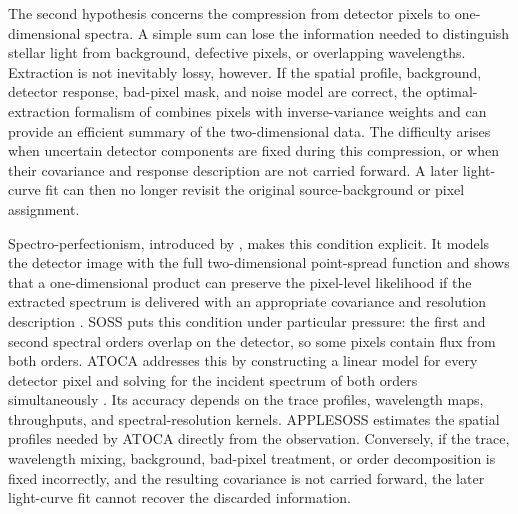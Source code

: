 The second hypothesis concerns the compression from detector pixels to
one-dimensional spectra. A simple sum can lose the information needed to
distinguish stellar light from background, defective pixels, or overlapping
wavelengths. Extraction is not inevitably lossy, however. If the spatial
profile, background, detector response, bad-pixel mask, and noise model are
correct, the optimal-extraction formalism of \citet{Horne1986} combines pixels
with inverse-variance weights and can provide an efficient summary of the
two-dimensional data. The difficulty arises when uncertain detector components
are fixed during this compression, or when their covariance and response
description are not carried forward. A later light-curve fit can then no
longer revisit the original source-background or pixel assignment.


Spectro-perfectionism, introduced by \citet{BoltonSchlegel2010}, makes this
condition explicit. It models the detector image with the full
two-dimensional point-spread function and shows that a one-dimensional product
can preserve the pixel-level likelihood if the extracted spectrum is delivered
with an appropriate covariance and resolution description
\citep{BoltonEtAl2012}. SOSS puts this condition under particular pressure:
the first and second spectral orders overlap on the detector, so some pixels
contain flux from both orders. ATOCA addresses this by constructing a linear
model for every detector pixel and solving for the incident spectrum of both
orders simultaneously \citep{DarveauBernierEtAl2022}. Its accuracy depends on
the trace profiles, wavelength maps, throughputs, and spectral-resolution
kernels. APPLESOSS \citep{RadicaEtAl2022} estimates the spatial profiles
needed by ATOCA directly from the observation. Conversely, if the trace,
wavelength mixing, background, bad-pixel treatment, or order decomposition is
fixed incorrectly, and the resulting covariance is not carried forward, the
later light-curve fit cannot recover the discarded information.


